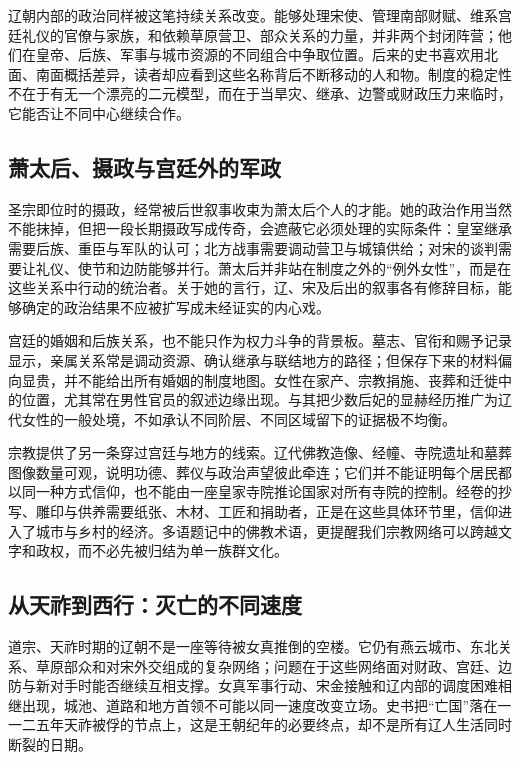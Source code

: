 辽朝内部的政治同样被这笔持续关系改变。能够处理宋使、管理南部财赋、维系宫廷礼仪的官僚与家族，和依赖草原营卫、部众关系的力量，并非两个封闭阵营；他们在皇帝、后族、军事与城市资源的不同组合中争取位置。后来的史书喜欢用北面、南面概括差异，读者却应看到这些名称背后不断移动的人和物。制度的稳定性不在于有无一个漂亮的二元模型，而在于当旱灾、继承、边警或财政压力来临时，它能否让不同中心继续合作。

\subsection{萧太后、摄政与宫廷外的军政}

圣宗即位时的摄政，经常被后世叙事收束为萧太后个人的才能。她的政治作用当然不能抹掉，但把一段长期摄政写成传奇，会遮蔽它必须处理的实际条件：皇室继承需要后族、重臣与军队的认可；北方战事需要调动营卫与城镇供给；对宋的谈判需要让礼仪、使节和边防能够并行。萧太后并非站在制度之外的“例外女性”，而是在这些关系中行动的统治者。关于她的言行，辽、宋及后出的叙事各有修辞目标，能够确定的政治结果不应被扩写成未经证实的内心戏。

宫廷的婚姻和后族关系，也不能只作为权力斗争的背景板。墓志、官衔和赐予记录显示，亲属关系常是调动资源、确认继承与联结地方的路径；但保存下来的材料偏向显贵，并不能给出所有婚姻的制度地图。女性在家产、宗教捐施、丧葬和迁徙中的位置，尤其常在男性官员的叙述边缘出现。与其把少数后妃的显赫经历推广为辽代女性的一般处境，不如承认不同阶层、不同区域留下的证据极不均衡。

宗教提供了另一条穿过宫廷与地方的线索。辽代佛教造像、经幢、寺院遗址和墓葬图像数量可观，说明功德、葬仪与政治声望彼此牵连；它们并不能证明每个居民都以同一种方式信仰，也不能由一座皇家寺院推论国家对所有寺院的控制。经卷的抄写、雕印与供养需要纸张、木材、工匠和捐助者，正是在这些具体环节里，信仰进入了城市与乡村的经济。多语题记中的佛教术语，更提醒我们宗教网络可以跨越文字和政权，而不必先被归结为单一族群文化。

\subsection{从天祚到西行：灭亡的不同速度}

道宗、天祚时期的辽朝不是一座等待被女真推倒的空楼。它仍有燕云城市、东北关系、草原部众和对宋外交组成的复杂网络；问题在于这些网络面对财政、宫廷、边防与新对手时能否继续互相支撑。女真军事行动、宋金接触和辽内部的调度困难相继出现，城池、道路和地方首领不可能以同一速度改变立场。史书把“亡国”落在一一二五年天祚被俘的节点上，这是王朝纪年的必要终点，却不是所有辽人生活同时断裂的日期。

